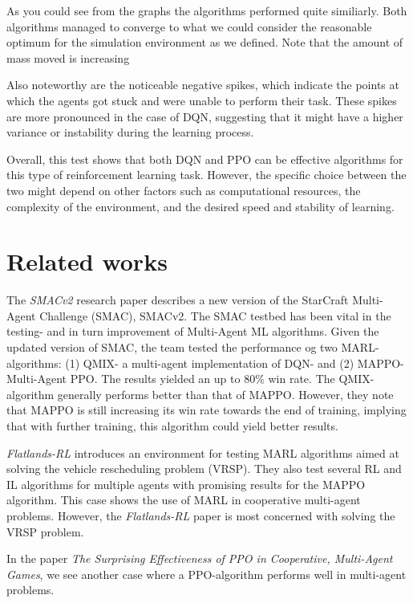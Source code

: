 \documentclass[conference]{IEEEtran}
\begin{document}
	As you could see from the graphs the algorithms performed quite similiarly.
	Both algorithms managed to converge to what we could consider the reasonable optimum for the simulation
	environment as we defined. Note that the amount of mass moved is increasing

	Also noteworthy are the noticeable negative spikes, which indicate the points at which the agents got
	stuck and were unable to perform their task. These spikes are more pronounced in the case of DQN,
	suggesting that it might have a higher variance or instability during the learning process.

	Overall, this test shows that both DQN and PPO can be effective algorithms for this type of reinforcement
	learning task. However, the specific choice between the two might depend on other factors such as
	computational resources, the complexity of the environment, and the desired speed and stability of
	learning.




	\section{Related works}
	The \textit{SMACv2} \cite{ellis2022smacv2} research paper describes a new version of the StarCraft Multi-Agent
	Challenge (SMAC), SMACv2. The SMAC testbed has been vital in the testing- and in turn improvement
	of Multi-Agent ML algorithms. Given the updated version of SMAC, the team tested the performance og two
	MARL- algorithms: (1) QMIX- a multi-agent implementation of DQN- and (2) MAPPO- Multi-Agent PPO. The
	results yielded an up to 80\% win rate. The QMIX-algorithm generally performs better than that of MAPPO.
	However, they note that MAPPO is still increasing its win rate towards the end of training, implying
	that with further training, this algorithm could yield better results.

	\textit{Flatlands-RL} \cite{laurent2021flatland} introduces an environment for testing MARL algorithms aimed at
	solving the vehicle rescheduling problem (VRSP). They also test several RL and IL algorithms for
	multiple agents with promising results for the MAPPO algorithm. This case shows the use of MARL in cooperative
	multi-agent problems. However, the \textit{Flatlands-RL} paper is most concerned with solving the VRSP problem.

	In the paper \textit{The Surprising Effectiveness of PPO in Cooperative, Multi-Agent Games}, \cite{yu2022surprising}
	we see another case where a PPO-algorithm performs well in multi-agent problems.
\end{document}
